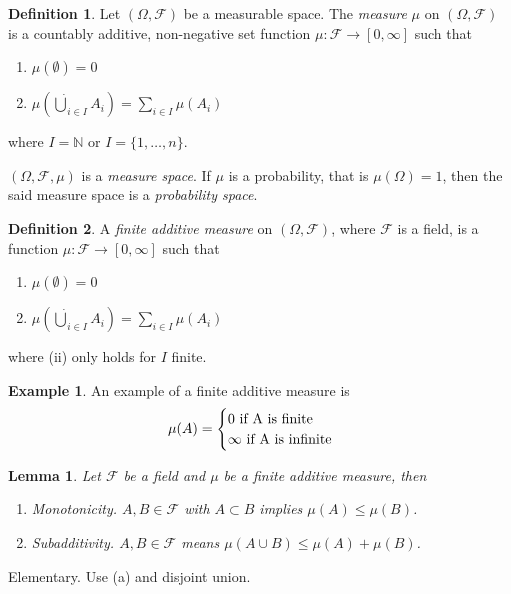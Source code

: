 \documentclass[11pt]{article}
\newtheorem{lemma}[thm]{Lemma}
\theoremstyle{definition}
\newtheorem{defn}{Definition}[section]
\newtheorem{example}{Example}[section]
\newcommand{\NN}{\mathbb{N}}
\begin{document}
\begin{defn}
    Let $(\Omega,\mathcal{F})$ be a measurable space. The \emph{measure} $\mu$ on
    $(\Omega,\mathcal{F})$ is a countably additive, non-negative set function
    $\mu:\mathcal{F}\to[0,\infty]$ such that 
    \begin{enumerate}
        \item[(i)] $\mu(\emptyset) = 0$
        \item[(ii)] $\mu(\dot\bigcup_{i\in{I}} A_i) = \sum_{i\in{I}} \mu(A_i)$
    \end{enumerate}
    where $I = \NN$ or $I = \{1,\dots,n\}$.

    $(\Omega,\mathcal{F},\mu)$ is a \emph{measure space}. If $\mu$ is a probability, that is
    $\mu(\Omega)=1$, then the said measure space is a \emph{probability space}.
\end{defn}

\begin{defn}
    A \emph{finite additive measure} on $(\Omega,\mathcal{F})$, where $\mathcal{F}$ is a field, is a
    function $\mu:\mathcal{F}\to[0,\infty]$ such that
    \begin{enumerate}
        \item[(i)] $\mu(\emptyset) = 0$
        \item[(ii)] $\mu(\dot\bigcup_{i\in{I}} A_i) = \sum_{i\in{I}} \mu(A_i)$
    \end{enumerate}
    where (ii) only holds for $I$ finite.
\end{defn}

\begin{example}
    An example of a finite additive measure is
    \[
        \mu(A) = \begin{cases}
            0 \text{ if } $A$ \text{ is finite } \\
            \infty \text{ if } $A$ \text{ is infinite }
        \end{cases}
    \]
\end{example}

\begin{lemma}
    Let $\mathcal{F}$ be a field and $\mu$ be a finite additive measure, then 
    \begin{enumerate}
        \item[(a)] Monotonicity. $A,B\in\mathcal{F}$ with $A\subset B$ implies $\mu(A)\le\mu(B)$.
        \item[(b)] Subadditivity. $A,B\in\mathcal{F}$ means $\mu(A\cup B) \le \mu(A)+\mu(B)$. 
    \end{enumerate}
\end{lemma}
\proof[Proof of (a).] Elementary. \qedhere
\proof[Proof of (b).] Use (a) and disjoint union. \qedhere
\end{document}
